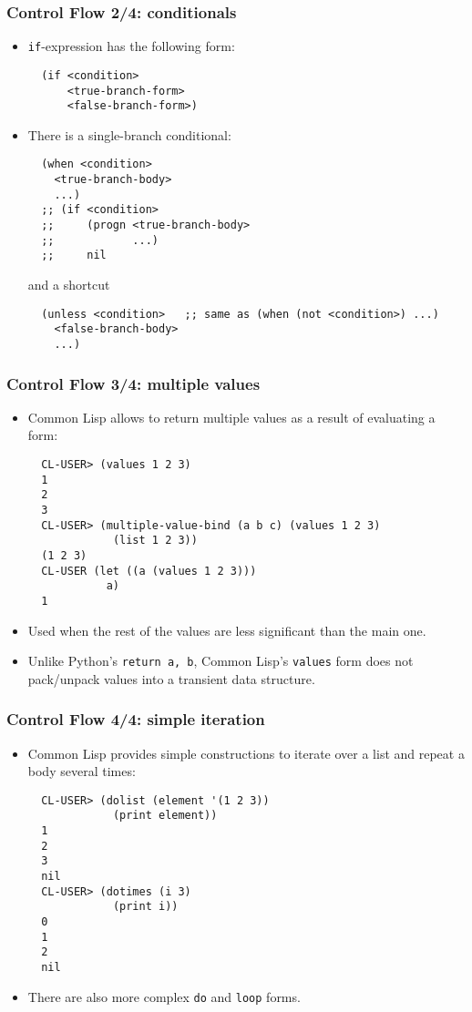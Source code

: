 \documentclass{beamer}
\begin{document}
\begin{frame}[fragile]
  \frametitle{Control Flow 2/4: conditionals}
  \begin{itemize}
  \item \texttt{if}-expression has the following form:
\begin{verbatim}
  (if <condition>
      <true-branch-form>
      <false-branch-form>)
\end{verbatim}
    
  \item There is a single-branch conditional:
\begin{verbatim}
  (when <condition>
    <true-branch-body>
    ...)
  ;; (if <condition>
  ;;     (progn <true-branch-body>
  ;;            ...)
  ;;     nil
\end{verbatim}
    and a shortcut
\begin{verbatim}
  (unless <condition>   ;; same as (when (not <condition>) ...)
    <false-branch-body>
    ...)
\end{verbatim}
  \end{itemize}
\end{frame}

\begin{frame}[fragile]
  \frametitle{Control Flow 3/4: multiple values}
  \begin{itemize}
  \item Common Lisp allows to return multiple values as a result of evaluating
    a form:
\begin{verbatim}
  CL-USER> (values 1 2 3)
  1
  2
  3
  CL-USER> (multiple-value-bind (a b c) (values 1 2 3)
             (list 1 2 3))
  (1 2 3)
  CL-USER (let ((a (values 1 2 3)))
            a)
  1
\end{verbatim}
  \item Used when the rest of the values are less significant than the main one.
  \item Unlike Python's \texttt{return a, b}, Common Lisp's
    \texttt{values} form does not pack/unpack values into a transient
    data structure.
  \end{itemize}
\end{frame}

\begin{frame}[fragile]
  \frametitle{Control Flow 4/4: simple iteration}
  \begin{itemize}
  \item Common Lisp provides simple constructions to iterate over a list and
    repeat a body several times:
\begin{verbatim}
  CL-USER> (dolist (element '(1 2 3))
             (print element))
  1
  2
  3
  nil
  CL-USER> (dotimes (i 3)
             (print i))
  0
  1
  2
  nil
\end{verbatim}
  \item There are also more complex \texttt{do} and
    \texttt{loop} forms.
  \end{itemize}
\end{frame}
\end{document}
